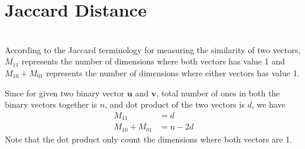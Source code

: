\documentclass[11pt,a4paper]{article}
\begin{document}
\begin{titlepage}
    \maketitle
\end{titlepage}
\renewcommand{\contentsname}{Contents}
\begin{center} 
    \tableofcontents 
    \listoffigures
\end{center}
\newpage

\section{Jaccard Distance}
\newcommand{\M}[1]{\ensuremath{M_{#1}}}
\newcommand{\binEpy}[2]{\ensuremath{-\big( \frac{#1}{#2} log_2(\frac{#1}{#2}) 
+ \frac{#2-#1}{#2} log_2(\frac{#2-#1}{#2})\big)}}

\\

According to the Jaccard terminology for measuring the similarity of two
vectors, $\M{11}$ represents the number of dimensions where both vectors has
value 1 and $\M{10} + \M{01}$ represents the number of dimensions where either
vectors has value 1.

Since for given two binary vector $\mathbf{u}$ and $\mathbf{v}$, total number
of ones in both the binary vectors together is $n$, and dot product of the two
vectors is $d$, we have
\begin{align*}
    \M{11} &= d \\
    \M{10} + \M{01} &= n-2d 
\end{align*}
Note that the dot product only count the dimensions where both vectors are 1.
\\
\end{document}
